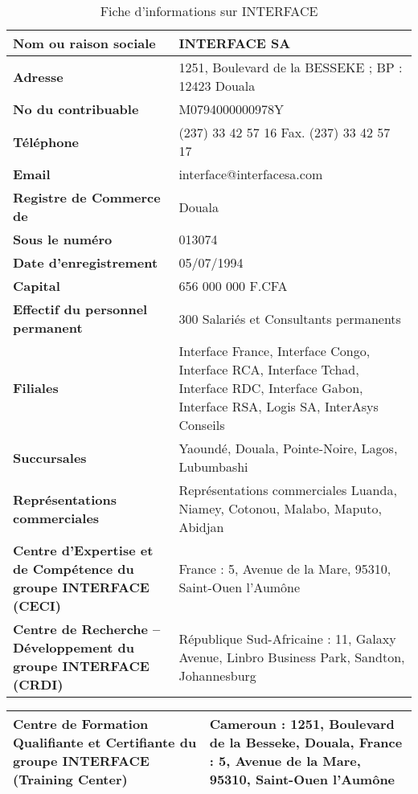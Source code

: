 \begin{table}[H]
    \centering
    \caption{Fiche d'informations sur INTERFACE}
    \begin{tabular}[t]{|p{7.5cm}|p{7.5cm}|} 
        \hline\hline
        \textbf{Nom ou raison sociale } & INTERFACE SA\\
        \hline
        \textbf{Adresse } & 1251, Boulevard de la BESSEKE ; BP : 12423 Douala \\
        \hline
        \textbf{No du contribuable  } & M0794000000978Y \\
        \hline
        \textbf{Téléphone  } & (237) 33 42 57 16  Fax. (237) 33 42 57 17   \\
        \hline
        \textbf{Email  } & interface@interfacesa.com \\
        \hline
        \textbf{Registre de Commerce de  } & Douala \\
        \hline
        \textbf{Sous le numéro  } & 013074 \\
        \hline
        \textbf{Date d’enregistrement  } & 05/07/1994  \\
        \hline
        \textbf{Capital  } & 656 000 000 F.CFA \\
        \hline
        \textbf{Effectif du personnel permanent } & 300 Salariés et Consultants permanents \\
        \hline
        \textbf{Filiales } & Interface France, Interface Congo, Interface RCA, Interface Tchad, Interface RDC, Interface Gabon, Interface RSA, Logis SA, InterAsys Conseils  \\
        \hline
        \textbf{Succursales } & Yaoundé, Douala, Pointe-Noire, Lagos, Lubumbashi \\
        \hline
        \textbf{Représentations commerciales } & Représentations commerciales	Luanda, Niamey, Cotonou, Malabo, Maputo, Abidjan \\
        \hline
        \textbf{Centre d’Expertise et de Compétence du groupe INTERFACE (CECI) } & France : 5, Avenue de la Mare, 95310, Saint-Ouen l’Aumône \\
        \hline
        \textbf{Centre de Recherche – Développement du groupe INTERFACE (CRDI) } & République Sud-Africaine : 11, Galaxy Avenue, Linbro Business Park, Sandton, Johannesburg \\
        \hline
    \end{tabular}
    \label{tab:infostab}
\end{table}


\begin{table}[H]
    \centering
    \begin{tabular}[t]{|p{7.5cm}|p{7.5cm}|} 
        \hline
        \textbf{Centre de Formation Qualifiante et Certifiante du groupe INTERFACE (Training Center) } & 
            Cameroun : 1251, Boulevard de la Besseke, Douala, 
            France : 5, Avenue de la Mare, 95310, Saint-Ouen l’Aumône
         \\
        \hline\hline
    \end{tabular}
\end{table}


